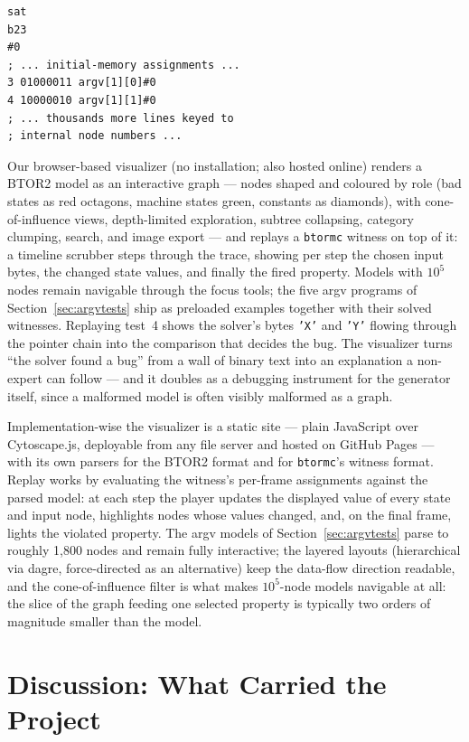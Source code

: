 \documentclass[sigplan,screen,nonacm]{acmart}
\begin{document}
\begin{lstlisting}
sat
b23
#0
; ... initial-memory assignments ...
3 01000011 argv[1][0]#0
4 10000010 argv[1][1]#0
; ... thousands more lines keyed to
; internal node numbers ...
\end{lstlisting}

Our browser-based visualizer (no installation; also hosted online)
renders a BTOR2 model as an interactive graph --- nodes shaped and
coloured by role (bad states as red octagons, machine states green,
constants as diamonds), with cone-of-influence views, depth-limited
exploration, subtree collapsing, category clumping, search, and image
export --- and replays a \texttt{btormc} witness on top of it: a
timeline scrubber steps through the trace, showing per step the chosen
input bytes, the changed state values, and finally the fired property.
Models with $10^5$ nodes remain navigable through the focus tools; the
five argv programs of Section~\ref{sec:argvtests} ship as preloaded
examples together with their solved witnesses. Replaying test~4 shows
the solver's bytes \texttt{'X'} and \texttt{'Y'} flowing through the
pointer chain into the comparison that decides the bug. The visualizer
turns ``the solver found a bug'' from a wall of binary text into an
explanation a non-expert can follow --- and it doubles as a debugging
instrument for the generator itself, since a malformed model is often
visibly malformed as a graph.

Implementation-wise the visualizer is a static site --- plain
JavaScript over Cytoscape.js, deployable from any file server and
hosted on GitHub Pages --- with its own parsers for the BTOR2 format
and for \texttt{btormc}'s witness format. Replay works by evaluating
the witness's per-frame assignments against the parsed model: at each
step the player updates the displayed value of every state and input
node, highlights nodes whose values changed, and, on the final frame,
lights the violated property. The argv models of
Section~\ref{sec:argvtests} parse to roughly 1{,}800 nodes and remain
fully interactive; the layered layouts (hierarchical via dagre,
force-directed as an alternative) keep the data-flow direction
readable, and the cone-of-influence filter is what makes $10^5$-node
models navigable at all: the slice of the graph feeding one selected
property is typically two orders of magnitude smaller than the model.

\section{Discussion: What Carried the Project}
\label{sec:discussion}
\end{document}
